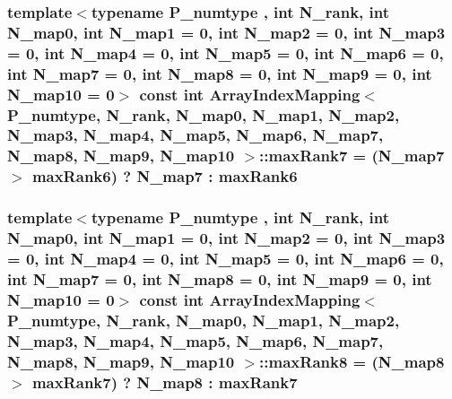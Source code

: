 \subsubsection[{max\+Rank7}]{\setlength{\rightskip}{0pt plus 5cm}template$<$typename P\+\_\+numtype , int N\+\_\+rank, int N\+\_\+map0, int N\+\_\+map1 = 0, int N\+\_\+map2 = 0, int N\+\_\+map3 = 0, int N\+\_\+map4 = 0, int N\+\_\+map5 = 0, int N\+\_\+map6 = 0, int N\+\_\+map7 = 0, int N\+\_\+map8 = 0, int N\+\_\+map9 = 0, int N\+\_\+map10 = 0$>$ const int {\bf Array\+Index\+Mapping}$<$ P\+\_\+numtype, N\+\_\+rank, N\+\_\+map0, N\+\_\+map1, N\+\_\+map2, N\+\_\+map3, N\+\_\+map4, N\+\_\+map5, N\+\_\+map6, N\+\_\+map7, N\+\_\+map8, N\+\_\+map9, N\+\_\+map10 $>$\+::max\+Rank7 = (N\+\_\+map7 $>$ {\bf max\+Rank6}) ? N\+\_\+map7 \+: {\bf max\+Rank6}\hspace{0.3cm}{\ttfamily [static]}}\label{classArrayIndexMapping_a70f6fd5b6e8e23248487b7fb047bd494}
\hypertarget{classArrayIndexMapping_a7fb0f9f1c04d24e03d050b60d29a5c68}{}
\subsubsection[{max\+Rank8}]{\setlength{\rightskip}{0pt plus 5cm}template$<$typename P\+\_\+numtype , int N\+\_\+rank, int N\+\_\+map0, int N\+\_\+map1 = 0, int N\+\_\+map2 = 0, int N\+\_\+map3 = 0, int N\+\_\+map4 = 0, int N\+\_\+map5 = 0, int N\+\_\+map6 = 0, int N\+\_\+map7 = 0, int N\+\_\+map8 = 0, int N\+\_\+map9 = 0, int N\+\_\+map10 = 0$>$ const int {\bf Array\+Index\+Mapping}$<$ P\+\_\+numtype, N\+\_\+rank, N\+\_\+map0, N\+\_\+map1, N\+\_\+map2, N\+\_\+map3, N\+\_\+map4, N\+\_\+map5, N\+\_\+map6, N\+\_\+map7, N\+\_\+map8, N\+\_\+map9, N\+\_\+map10 $>$\+::max\+Rank8 = (N\+\_\+map8 $>$ {\bf max\+Rank7}) ? N\+\_\+map8 \+: {\bf max\+Rank7}\hspace{0.3cm}{\ttfamily [static]}}\label{classArrayIndexMapping_a7fb0f9f1c04d24e03d050b60d29a5c68}
\hypertarget{classArrayIndexMapping_a8cfa29ef71a3141bec2f5a4463b80286}{}

